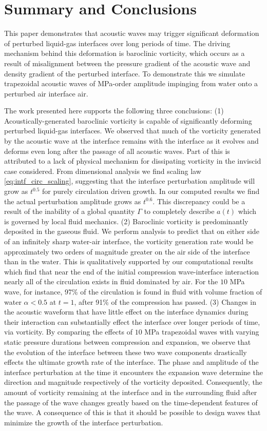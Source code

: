 \section{Summary and Conclusions}
\label{sec:conclusions}
This paper demonstrates that acoustic waves may trigger significant
deformation of perturbed liquid-gas interfaces over long periods of
time. The driving mechanism behind this deformation is baroclinic
vorticity, which occurs as a result of misalignment between the
pressure gradient of the acoustic wave and density gradient of the
perturbed interface. To demonstrate this we simulate trapezoidal
acoustic waves of MPa-order amplitude impinging from water onto a
perturbed air interface air.

The work presented here supports the following three conclusions: (1)
Acoustically-generated baroclinic vorticity is capable of
significantly deforming perturbed liquid-gas interfaces. We observed
that much of the vorticity generated by the acoustic wave at the
interface remains with the interface as it evolves and deforms even
long after the passage of all acoustic waves. Part of this is
attributed to a lack of physical mechanism for dissipating vorticity
in the inviscid case considered. From dimensional analysis we find
scaling law \eqref{eq:intf_circ_scaling}, suggesting that the
interface perturbation amplitude will grow as $t^{0.5}$ for purely
circulation driven growth. In our computed results we find the actual
perturbation amplitude grows as $t^{0.6}$. This discrepancy could be a
result of the inability of a global quantity $\Gamma$ to completely
describe $a(t)$ which is governed by local fluid mechanics.
%
(2) Baroclinic vorticity is predominantly deposited in the gaseous
fluid. We perform analysis to predict that on either side of an
infinitely sharp water-air interface, the vorticity generation rate
would be approximately two orders of magnitude greater on the air side
of the interface than in the water. This is qualitatively supported by
our computational results which find that near the end of the initial
compression wave-interface interaction nearly all of the circulation
exists in fluid dominated by air. For the $10$ MPa wave, for instance,
97\% of the circulation is found in fluid with volume fraction of
water $\alpha<0.5$ at $t=1$, after 91\% of the compression has passed.
%
(3) Changes in the acoustic waveform that have little effect on the
interface dynamics during their interaction can substantially effect
the interface over longer periods of time, via vorticity. By comparing
the effects of $10$ MPa trapezoidal waves with varying static pressure
durations between compression and expansion, we observe that the
evolution of the interface between these two wave components
drastically effects the ultimate growth rate of the interface. The
phase and amplitude of the interface perturbation at the time it
encounters the expansion wave determine the direction and magnitude
respectively of the vorticity deposited. Consequently, the amount of
vorticity remaining at the interface and in the surrounding fluid
after the passage of the wave changes greatly based on the
time-dependent features of the wave. A consequence of this is that it
should be possible to design waves that minimize the growth of the
interface perturbation.

